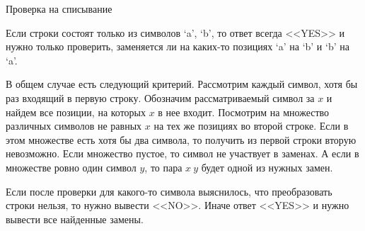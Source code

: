 \begin{tutorial}{Проверка на списывание}

Если строки состоят только из символов `a', `b', то ответ всегда <<YES>> и нужно только проверить, заменяется ли на каких-то позициях `a' на `b' и `b' на `a'. 

В общем случае есть следующий критерий. Рассмотрим каждый символ, хотя бы раз входящий в первую строку. Обозначим рассматриваемый символ за $x$ и найдем все позиции, на которых $x$ в нее входит. Посмотрим на множество различных символов не равных $x$ на тех же позициях во второй строке. Если в этом множестве есть хотя бы два символа, то получить из первой строки вторую невозможно. Если множество пустое, то символ не участвует в заменах. А если в множестве ровно один символ $y$, то пара $x\ y$ будет одной из нужных замен. 

Если после проверки для какого-то символа выяснилось, что преобразовать строки нельзя, то нужно вывести <<NO>>. Иначе ответ <<YES>> и нужно вывести все найденные замены.

\end{tutorial}
